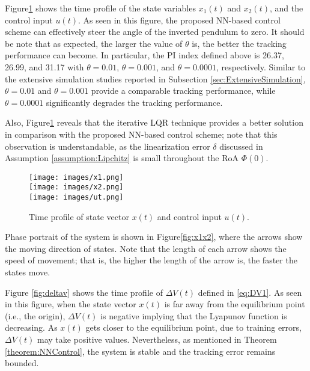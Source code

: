 \documentclass[1p,times]{elsarticle}
\begin{document}



Figure\ref{fig:ResultsStateInput} shows the time profile of the state variables $x_1(t)$ and $x_2(t)$, and the control input $u(t)$. As seen in this figure, the proposed NN-based control scheme can effectively steer the angle of the inverted pendulum to zero. It should be note that as expected, the larger the value of $\theta$ is, the better the tracking performance can become. In particular, the PI index defined above is 26.37, 26.99, and 31.17 with $\theta=0.01$, $\theta=0.001$, and $\theta=0.0001$, respectively. Similar to the extensive simulation studies reported in Subsection \ref{sec:ExtensiveSimulation}, $\theta=0.01$ and $\theta=0.001$ provide a comparable tracking performance, while $\theta=0.0001$ significantly degrades the tracking performance. 

{{\color{blue}}
Also, Figure\ref{fig:ResultsStateInput} reveals that the iterative LQR technique provides a better solution in comparison with the proposed NN-based control scheme; note that this observation is understandable, as the linearization error $\delta$ discussed in Assumption \ref{assumption:Lipchitz} is small throughout the RoA $\Phi(0)$.}






\begin{figure}[!t]
    \centering
    \texttt{[image: images/x1.png]}\\
    \texttt{[image: images/x2.png]}\\
    \texttt{[image: images/ut.png]}\\
    \caption{{{\color{blue}}Time profile of state vector $x(t)$ and control input $u(t)$.}}
    \label{fig:ResultsStateInput}
\end{figure}



Phase portrait of the system is shown in Figure\ref{fig:x1x2}, where the arrows show the moving direction of states. Note that the length of each arrow shows the speed of movement; that is, the higher the length of the arrow is, the faster the states move. 


Figure \ref{fig:deltav} shows the time profile of $\Delta V(t)$ defined in \eqref{eq:DV1}. As seen in this figure, when the state vector $x(t)$ is far away from the equilibrium point (i.e., the origin), $\Delta V(t)$ is negative implying that the Lyapunov function is decreasing. As $x(t)$ gets closer to the equilibrium point, due to training errors, $\Delta V(t)$ may take positive values. Nevertheless, as mentioned in Theorem \ref{theorem:NNControl}, the system is stable and the tracking error remains bounded. 
\end{document}
